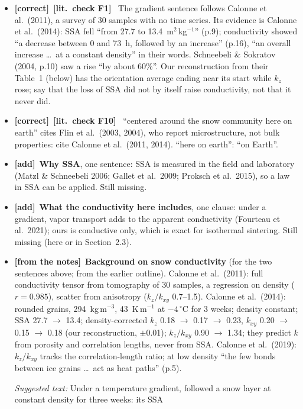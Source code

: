 \documentclass[11pt]{article}
\newcommand{\Note}{\textcolor{open}{\textbf{[from the notes]}}\ }
\newcommand{\tC}{\textcolor{miss}{\textbf{[correct]}}\ }
\newcommand{\tA}{\textcolor{have}{\textbf{[add]}}\ }
\newcommand{\Chk}[1]{\textcolor{chk}{\textbf{[lit.\ check #1]}}\ }
\newcommand{\Snippet}[1]{\par\smallskip\noindent\colorbox{chk!8}{\parbox{0.96\linewidth}{\small\textit{Suggested text:} #1}}\par\smallskip}
\providecommand{\citet}[1]{\texttt{\detokenize{#1}}}
\begin{document}
\begin{enumerate}
\begin{itemize}
    temperature and porosity.
  \item \tC \Chk{F1} The gradient sentence follows Calonne et al.\ (2011), a
    survey of 30 samples with no time series. Its evidence is Calonne et
    al.\ (2014): SSA fell ``from 27.7 to 13.4~m$^2$\,kg$^{-1}$'' (p.9);
    conductivity showed ``a decrease between 0 and 73~h, followed by an
    increase'' (p.16), ``an overall increase \ldots\ at a constant density''
    in their words. Schneebeli \& Sokratov (2004, p.10) saw a rise ``by about
    60\%''. Our reconstruction from their Table~1 (below) has the
    orientation average ending near its start while $k_z$ rose; say that the
    loss of SSA did not by itself raise conductivity, not that it never did.
  \item \tC \Chk{F10} ``centered around the snow community here on earth''
    cites Flin et al.\ (2003, 2004), who report microstructure, not bulk
    properties: cite Calonne et al.\ (2011, 2014). ``here on earth'': ``on
    Earth''.
  \item \tA \textbf{Why SSA}, one sentence: SSA is measured in the field and
    laboratory (Matzl \& Schneebeli 2006; Gallet et al.\ 2009; Proksch et
    al.\ 2015), so a law in SSA can be applied. Still missing.
  \item \tA \textbf{What the conductivity here includes}, one clause: under a
    gradient, vapor transport adds to the apparent conductivity (Fourteau et
    al.\ 2021); ours is conductive only, which is exact for isothermal
    sintering. Still missing (here or in Section~2.3).
  \item \Note \textbf{Background on snow conductivity} (for the two
    sentences above; from the earlier outline). Calonne et al.\ (2011):
    full conductivity tensor from tomography of 30 samples, a regression on
    density ($r = 0.985$), scatter from anisotropy ($k_z/k_{xy}$ 0.7--1.5).
    Calonne et al.\ (2014): rounded grains, 294~kg\,m$^{-3}$, 43~K\,m$^{-1}$
    at $-4\,^\circ$C for 3 weeks; density constant; SSA 27.7 $\to$ 13.4;
    density-corrected $k_z$ 0.18 $\to$ 0.17 $\to$ 0.23, $k_{xy}$ 0.20 $\to$
    0.15 $\to$ 0.18 (our reconstruction, $\pm$0.01); $k_z/k_{xy}$ 0.90
    $\to$ 1.34; they predict $k$ from porosity and correlation lengths, never
    from SSA. Calonne et al.\ (2019): $k_z/k_{xy}$ tracks the
    correlation-length ratio; at low density ``the few bonds between ice
    grains \ldots\ act as heat paths'' (p.5).
  \Snippet{Under a temperature gradient, \citet{calonneStudyTemperatureGradient2014}
    followed a snow layer at constant density for three weeks: its SSA
}
\end{itemize}
\end{enumerate}
\end{document}
